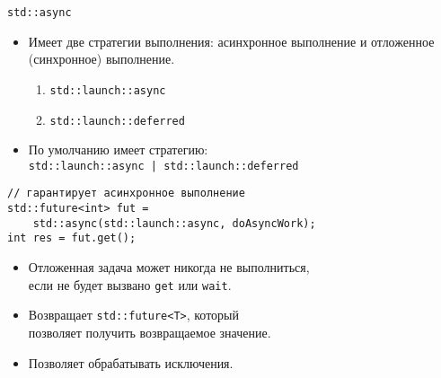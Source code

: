\documentclass[aspectration=1610,t]{beamer}
\begin{document}
\begin{frame}[fragile]{\texttt{std::async}}
    \begin{itemize}
        \item Имеет две стратегии выполнения: асинхронное выполнение и
            отложенное (синхронное) выполнение.
                \begin{enumerate}
                    \item \texttt{std::launch::async}
                    \item \texttt{std::launch::deferred}
                \end{enumerate}
        \item По умолчанию имеет стратегию:\\
             \texttt{std::launch::async | std::launch::deferred}
\end{itemize}
\begin{lstlisting}
// гарантирует асинхронное выполнение
std::future<int> fut = 
    std::async(std::launch::async, doAsyncWork);
int res = fut.get();
\end{lstlisting}
\begin{itemize}
        \item Отложенная задача может никогда не выполниться,\\
            если не будет вызвано \texttt{get} или \texttt{wait}.

        \item Возвращает \texttt{std::future<T>}, который\\ позволяет
            получить возвращаемое значение.
            
        \item Позволяет обрабатывать исключения.
    \end{itemize}
\end{frame}
\end{document}
